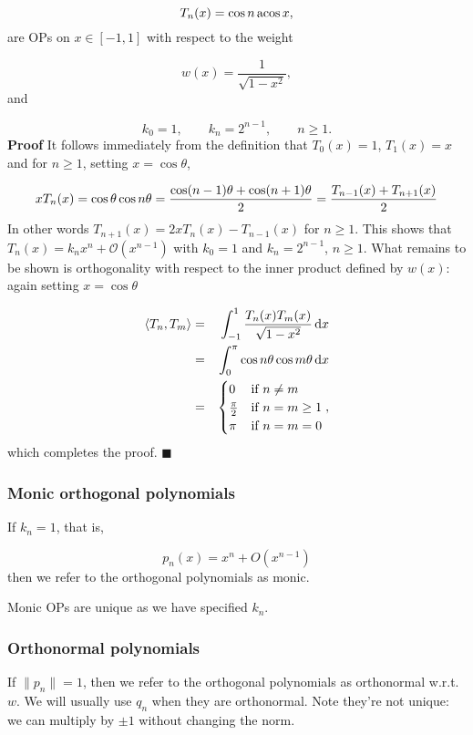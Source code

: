 \documentclass[12pt,landscape]{article}
\begin{document}
{\[
T_n(x) = \cos n\,{\rm acos}\, x,
\]
are OPs on $x \in [-1, 1]$ with respect to the weight

\[
w(x) = \frac{1}{\sqrt{1 - x^2}},
\]
and

\[
k_0 = 1, \qquad k_n = 2^{n-1}, \qquad n \geq 1.
\]
\textbf{Proof}  It follows immediately from the definition that $T_0(x) = 1$, $T_{1}(x) = x$ and for $n \geq 1$, setting $x = \cos \theta$,

\[
x T_n(x) = \cos \ensuremath{\theta} \cos n \ensuremath{\theta} = {\cos(n-1)\ensuremath{\theta} + \cos(n+1)\ensuremath{\theta} \over 2} = {T_{n-1}(x) + T_{n+1}(x) \over 2}
\]
In other words $T_{n+1}(x) = 2x T_n(x) - T_{n-1}(x)$ for $n \geq 1$. This shows that $T_n(x) = k_nx^{n} + \mathcal{O}(x^{n-1})$ with $k_0 = 1$ and $k_n = 2^{n-1}$, $n \geq 1$.  What remains to be shown is orthogonality with respect to the inner product defined by $w(x)$: again setting $x = \cos \theta$


\begin{eqnarray*}
\langle T_n, T_m\rangle &=& \int_{-1}^{1}\frac{T_n(x)T_m(x)}{\sqrt{1 - x^2}}\, {\rm d}x \\
  &= & \int_{0}^{\pi} \cos n\theta \cos m\theta \, {\rm d}x \\
  &=& \begin{cases} 
0 & \text{if } n \neq m \\
\frac{\pi}{2} & \text{if } n = m \geq 1 \\
\pi & \text{if } n = m = 0
\end{cases},
\end{eqnarray*}
which completes the proof.  $\blacksquare$

\subsubsection{Monic orthogonal polynomials}
If $k_n = 1$, that is,

\[
p_n(x) = x^n + O(x^{n-1})
\]
then we refer to the orthogonal polynomials as monic.

Monic OPs are unique as we have specified $k_n$.

\subsubsection{Orthonormal polynomials}
If  $\| p_n \| = 1$, then we refer to the orthogonal polynomials as orthonormal w.r.t. $w$. We will usually use $q_n$ when they are orthonormal.   Note they're not unique: we can multiply by $\pm 1$ without changing the norm.

}
\end{document}
